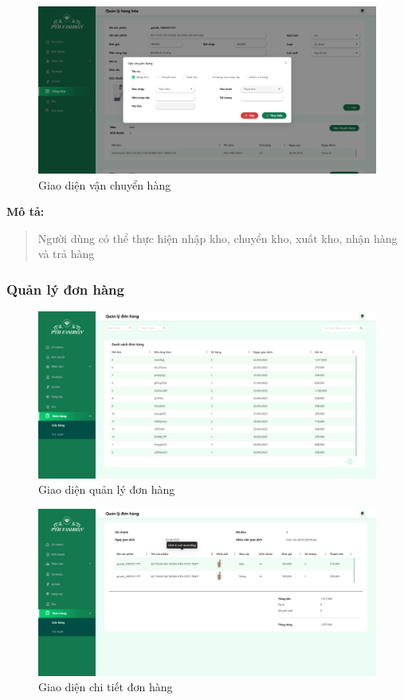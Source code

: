\begin{figure}[!htp]
    \centering
    \includegraphics[width=12cm]{img/UI/admin_implement/goodsTransfer.png}
    \newline
    \caption{Giao diện vận chuyển hàng}
\end{figure}
\textbf{Mô tả:}
\begin{quote}
    Người dùng có thể thực hiện nhập kho, chuyển kho, xuất kho, nhận hàng và trả hàng
\end{quote}

\newpage

\subsubsection{Quản lý đơn hàng}
\begin{figure}[!htp]
    \centering
    \includegraphics[width=12cm]{img/UI/admin_implement/order.png}
    \newline
    \caption{Giao diện quản lý đơn hàng}
\end{figure}

\begin{figure}[!htp]
    \centering
    \includegraphics[width=12cm]{img/UI/admin_implement/orderDetail.png}
    \newline
    \caption{Giao diện chi tiết đơn hàng}
\end{figure}

